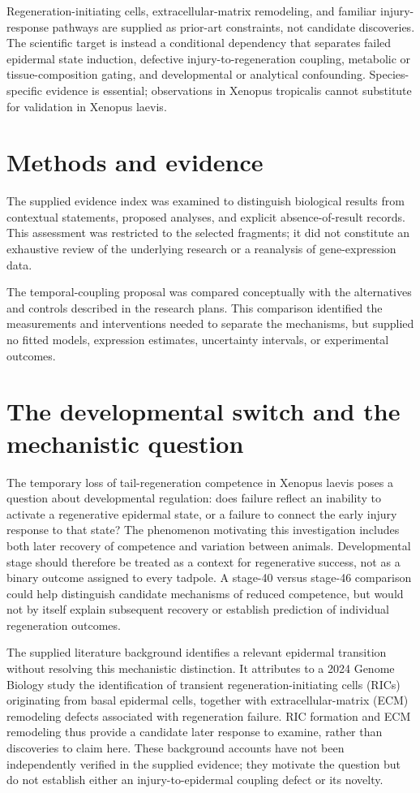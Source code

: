 \documentclass[11pt]{article}
\begin{document}
Regeneration-initiating cells, extracellular-matrix remodeling, and familiar injury-response pathways are supplied as prior-art constraints, not candidate discoveries. The scientific target is instead a conditional dependency that separates failed epidermal state induction, defective injury-to-regeneration coupling, metabolic or tissue-composition gating, and developmental or analytical confounding. Species-specific evidence is essential; observations in Xenopus tropicalis cannot substitute for validation in Xenopus laevis.

\section{Methods and evidence}
The supplied evidence index was examined to distinguish biological results from contextual statements, proposed analyses, and explicit absence-of-result records. This assessment was restricted to the selected fragments; it did not constitute an exhaustive review of the underlying research or a reanalysis of gene-expression data.

The temporal-coupling proposal was compared conceptually with the alternatives and controls described in the research plans. This comparison identified the measurements and interventions needed to separate the mechanisms, but supplied no fitted models, expression estimates, uncertainty intervals, or experimental outcomes.

\section{The developmental switch and the mechanistic question}
The temporary loss of tail-regeneration competence in Xenopus laevis poses a question about developmental regulation: does failure reflect an inability to activate a regenerative epidermal state, or a failure to connect the early injury response to that state? The phenomenon motivating this investigation includes both later recovery of competence and variation between animals. Developmental stage should therefore be treated as a context for regenerative success, not as a binary outcome assigned to every tadpole. A stage-40 versus stage-46 comparison could help distinguish candidate mechanisms of reduced competence, but would not by itself explain subsequent recovery or establish prediction of individual regeneration outcomes.

The supplied literature background identifies a relevant epidermal transition without resolving this mechanistic distinction. It attributes to a 2024 Genome Biology study the identification of transient regeneration-initiating cells (RICs) originating from basal epidermal cells, together with extracellular-matrix (ECM) remodeling defects associated with regeneration failure. RIC formation and ECM remodeling thus provide a candidate later response to examine, rather than discoveries to claim here. These background accounts have not been independently verified in the supplied evidence; they motivate the question but do not establish either an injury-to-epidermal coupling defect or its novelty.
\end{document}
